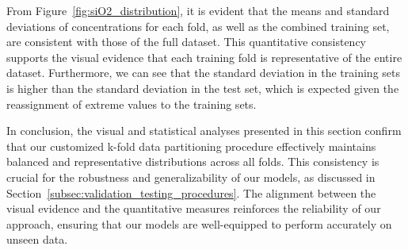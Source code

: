 From Figure~\ref{fig:siO2_distribution}, it is evident that the means and standard deviations of  concentrations for each fold, as well as the combined training set, are consistent with those of the full dataset.
This quantitative consistency supports the visual evidence that each training fold is representative of the entire dataset.
Furthermore, we can see that the standard deviation in the training sets is higher than the standard deviation in the test set, which is expected given the reassignment of extreme values to the training sets.

In conclusion, the visual and statistical analyses presented in this section confirm that our customized k-fold data partitioning procedure effectively maintains balanced and representative distributions across all folds.
This consistency is crucial for the robustness and generalizability of our models, as discussed in Section~\ref{subsec:validation_testing_procedures}.
The alignment between the visual evidence and the quantitative measures reinforces the reliability of our approach, ensuring that our models are well-equipped to perform accurately on unseen data.